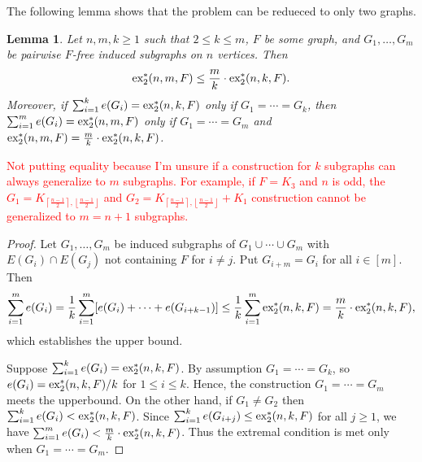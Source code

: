 \documentclass[12pt]{report}
\newtheorem{lemma}[theorem]{Lemma}
\newcommand*{\dex}{\textnormal{ex}_2}
\begin{document}
The following lemma shows that the problem can be redueced to only two graphs.

\begin{lemma}\label{lem:induce-reduce}
  Let $n, m, k \geq 1$ such that $2 \leq k \leq m$, $F$ be some graph, and $G_1, \ldots, G_m$ be pairwise $F$-free induced subgraphs on $n$ vertices. Then
  \[
    \dex^*(n, m, F) \leq \frac{m}{k} \cdot \dex^*(n, k, F).
  \]
  Moreover, if $\sum_{i = 1}^k e(G_i) = \dex^*(n, k, F)$ only if $G_1 = \cdots = G_k$, then $\sum_{i = 1}^m e(G_i) = \dex^*(n, m, F)$ only if $G_1 = \cdots = G_m$ and $\dex^*(n, m, F) = \frac{m}{k} \cdot \dex^*(n, k, F)$.
\end{lemma}

\textcolor{red}{Not putting equality because I'm unsure if a construction for $k$ subgraphs can always generalize to $m$ subgraphs. For example, if $F = K_3$ and $n$ is odd, the $G_1 = K_{\left\lceil\frac{n - 1}{2}\right\rceil, \left\lfloor\frac{n - 1}{2}\right\rfloor}$ and $G_2 = K_{\left\lceil\frac{n - 1}{2}\right\rceil, \left\lfloor\frac{n - 1}{2}\right\rfloor} + K_1$ construction cannot be generalized to $m = n + 1$ subgraphs.}

\begin{proof}
  Let $G_1, \ldots, G_m$ be induced subgraphs of $G_1 \cup \cdots \cup G_m$ with $E(G_i) \cap E(G_j)$ not containing $F$ for $i \neq j$. Put $G_{i + m} = G_i$ for all $i \in [m]$. Then
  \[
    \sum_{i = 1}^m e(G_i) = \frac{1}{k}\sum_{i = 1}^m [e(G_i) + \cdots + e(G_{i + k - 1})] \leq \frac{1}{k}\sum_{i = 1}^m \dex^*(n, k, F) = \frac{m}{k} \cdot \dex^*(n, k, F),
  \]
  which establishes the upper bound.

  Suppose $\sum_{i = 1}^k e(G_i) = \dex^*(n, k, F)$. By assumption $G_1 = \cdots = G_k$, so $e(G_i) = \dex^*(n, k, F)/k$ for $1 \leq i \leq k$. Hence, the construction $G_1 = \cdots = G_m$ meets the upperbound. On the other hand, if $G_1 \neq G_2$ then $\sum_{i = 1}^k e(G_i) < \dex^*(n, k, F)$. Since $\sum_{i = 1}^k e(G_{i + j}) \leq \dex^*(n, k, F)$ for all $j \geq 1$, we have $\sum_{i = 1}^m e(G_i) < \frac{m}{k} \cdot \dex^*(n, k, F)$. Thus the extremal condition is met only when $G_1 = \cdots = G_m$.
\end{proof}
\end{document}
